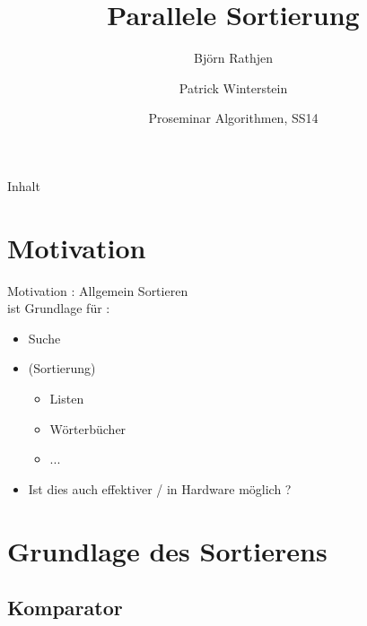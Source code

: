 \documentclass[ucs,9pt]{beamer}
\title[Para Sort] %
{Parallele Sortierung}
\author[] %
{Björn Rathjen \and Patrick Winterstein}
\institute[FU Berlin] %
{Freie Universität Berlin}
\date[ProSem Algo]
{Proseminar Algorithmen, SS14}
\begin{document}
\begin{frame}[plain]
  \titlepage
\end{frame}
 
\begin{frame}{Inhalt}
\end{frame}


\section{Motivation}

\begin{frame}{Motivation : Allgemein}
Sortieren \\
    ist Grundlage für :
    \begin{itemize}
        \item Suche
        \item (Sortierung)
        \begin{itemize}
            \item Listen
            \item Wörterbücher
            \item ... 
        \end{itemize}
        \item Ist dies auch effektiver / in Hardware möglich ?
    \end{itemize}
\end{frame}

\section{Grundlage des Sortierens}
\subsection{Komparator}
\end{document}
